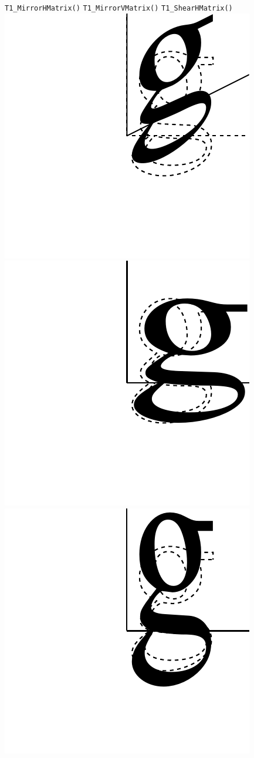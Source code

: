 \begin{figure}[t]
\hfill\break
\noindent\vrule width 0pt\hfill\verb+T1_MirrorHMatrix()+\hfill
\verb+T1_MirrorVMatrix()+\hfill
\verb+T1_ShearHMatrix()+\hfill\break
\vskip0.5cm
\hfill
\includegraphics[scale=0.5]{shearv}
\hfill
\includegraphics[scale=0.5]{extenth}
\hfill
\includegraphics[scale=0.5]{extentv}

\end{figure}

